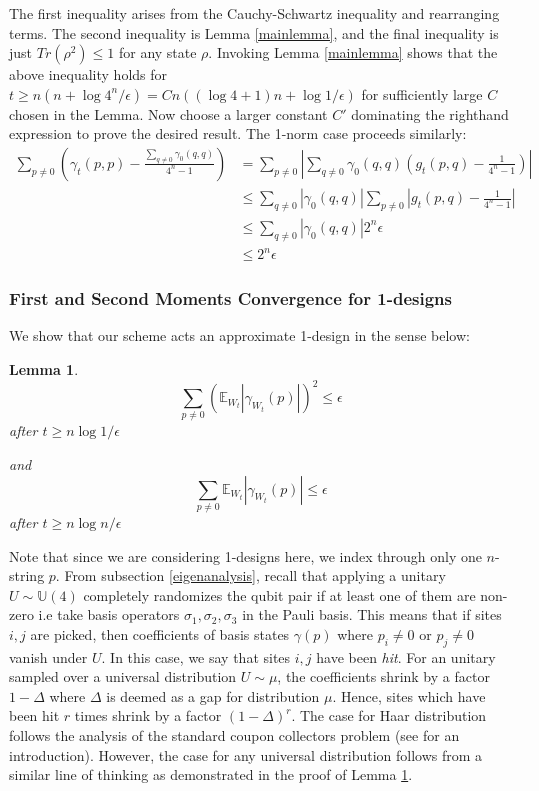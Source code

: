 \documentclass[12pt]{amsart}
\newtheorem{lemma}[theorem]{Lemma}
\theoremstyle{definition}
\theoremstyle{remark}
\numberwithin{equation}{section}
\theoremstyle{remark}
\begin{document}
The first inequality arises from the Cauchy-Schwartz inequality and rearranging terms. The second inequality is Lemma \ref{mainlemma}, and the final inequality is just $Tr(\rho^2) \leq 1$ for any state $\rho$. Invoking Lemma \ref{mainlemma} shows that the above inequality holds for $t \geq n(n + \log4^n/\epsilon) = Cn((\log 4 + 1)n + \log1/\epsilon)$ for sufficiently large $C$ chosen in the Lemma. Now choose a larger constant $C'$ dominating the righthand expression to prove the desired result. The 1-norm case proceeds similarly:
%
\begin{align*}
 \sum_{p \neq 0} \left( \gamma_t(p,p) - \frac{\sum_{q \neq 0} \gamma_0(q,q)}{4^n -1}\right)
 & = \sum_{p \neq 0} \left|\sum_{q\neq 0} \gamma_0(q,q) \left( g_t(p,q) - \frac{1}{4^n -1} \right) \right| \\
 & \leq \sum_{q \neq 0}|\gamma_0(q,q)|\sum_{p \neq 0} \left| g_t(p,q) - \frac{1}{4^n -1} \right| \\
 & \leq \sum_{q \neq 0}|\gamma_0(q,q)| 2^n \epsilon \\
 & \leq 2^n \epsilon
\end{align*}
%
\subsubsection{First and Second Moments Convergence for 1-designs}
We show that our scheme acts an approximate 1-design in the sense below:
%
\begin{lemma} \label{onedesign}
  \begin{equation}
    \sum_{p \neq 0} (\mathbb{E}_{W_t}|\gamma_{W_t}(p)|)^2 \leq \epsilon
  \end{equation}
  after $t \geq n\log1/\epsilon$

and
\begin{equation}
  \sum_{p \neq 0} \mathbb{E}_{W_t}|\gamma_{W_t}(p)| \leq \epsilon
\end{equation}
after $t \geq n\log n/\epsilon$
\end{lemma}

Note that since we are considering 1-designs here, we index through only one $n$-string $p$. From subsection \ref{eigenanalysis}, recall that applying a unitary $U \sim \mathbb{U}(4)$ completely randomizes the qubit pair if at least one of them are non-zero i.e take basis operators $\sigma_1,\sigma_2,\sigma_3$ in the Pauli basis. This means that if sites $i,j$ are picked, then coefficients of basis states $\gamma(p)$ where $p_i \neq 0$ or $p_j \neq 0$ vanish under $U$. In this case, we say that sites $i,j$ have been \emph{hit}. For an unitary sampled over a universal distribution $U \sim \mu$, the coefficients shrink by a factor $1 - \Delta$ where $\Delta$ is deemed as a gap for distribution $\mu$. Hence, sites which have been hit $r$ times shrink by a factor $(1- \Delta)^r$. The case for Haar distribution follows the analysis of the standard coupon collectors problem (see \cite{raghavan} for an introduction). However, the case for any universal distribution follows from a similar line of thinking as demonstrated in the proof of Lemma \ref{onedesign}.
\end{document}
